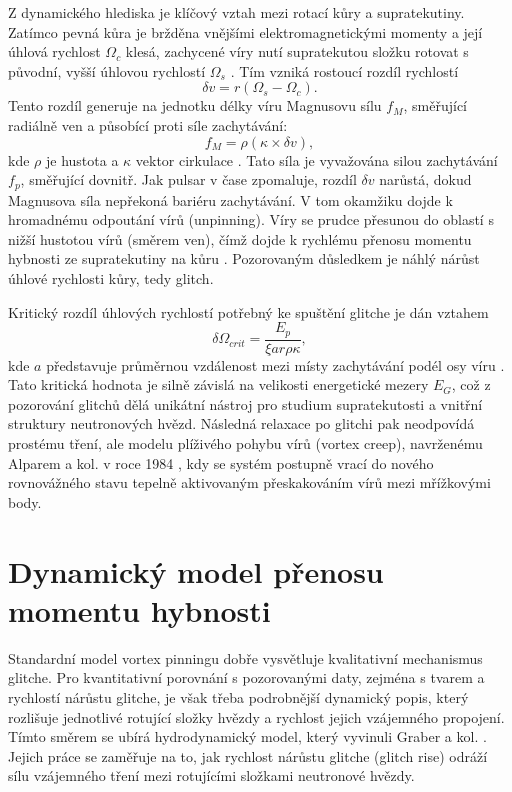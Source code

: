 \documentclass[%
final%
,htext%
]{ipothes}
\begin{document}
Z dynamického hlediska je klíčový vztah mezi rotací kůry a supratekutiny. Zatímco pevná kůra je bržděna vnějšími elektromagnetickými momenty a její úhlová rychlost $\Omega_c$ klesá, zachycené víry nutí supratekutou složku rotovat s původní, vyšší úhlovou rychlostí $\Omega_s$ \cite{ghosh2007}. Tím vzniká rostoucí rozdíl rychlostí
\begin{equation}
\delta v = r(\Omega_s - \Omega_c).
\end{equation}
Tento rozdíl generuje na jednotku délky víru Magnusovu sílu $f_M$, směřující radiálně ven a působící proti síle zachytávání:
\begin{equation}
f_M = \rho(\kappa \times \delta v),
\end{equation}
kde $\rho$ je hustota a $\kappa$ vektor cirkulace \cite{ghosh2007}. Tato síla je vyvažována silou zachytávání $f_p$, směřující dovnitř. Jak pulsar v čase zpomaluje, rozdíl $\delta v$ narůstá, dokud Magnusova síla nepřekoná bariéru zachytávání. V tom okamžiku dojde k hromadnému odpoutání vírů (unpinning). Víry se prudce přesunou do oblastí s nižší hustotou vírů (směrem ven), čímž dojde k rychlému přenosu momentu hybnosti ze supratekutiny na kůru \cite{anderson1975}. Pozorovaným důsledkem je náhlý nárůst úhlové rychlosti kůry, tedy glitch.

Kritický rozdíl úhlových rychlostí potřebný ke spuštění glitche je dán vztahem
\begin{equation}
\delta\Omega_{crit} = \frac{E_p}{\xi a r \rho \kappa},
\end{equation}
kde $a$ představuje průměrnou vzdálenost mezi místy zachytávání podél osy víru \cite{ghosh2007}. Tato kritická hodnota je silně závislá na velikosti energetické mezery $E_G$, což z pozorování glitchů dělá unikátní nástroj pro studium supratekutosti a vnitřní struktury neutronových hvězd. Následná relaxace po glitchi pak neodpovídá prostému tření, ale modelu plíživého pohybu vírů (vortex creep), navrženému Alparem a kol. v roce 1984 \cite{alpar1984}, kdy se systém postupně vrací do nového rovnovážného stavu tepelně aktivovaným přeskakováním vírů mezi mřížkovými body.



\clearpage
\section{Dynamický model přenosu momentu hybnosti}
 
Standardní model vortex pinningu dobře vysvětluje kvalitativní mechanismus glitche. Pro kvantitativní porovnání s pozorovanými daty, zejména s tvarem a rychlostí nárůstu glitche, je však třeba podrobnější dynamický popis, který rozlišuje jednotlivé rotující složky hvězdy a rychlost jejich vzájemného propojení. Tímto směrem se ubírá hydrodynamický model, který vyvinuli Graber a kol. \cite{graber2018}. Jejich práce se zaměřuje na to, jak rychlost nárůstu glitche (glitch rise) odráží sílu vzájemného tření mezi rotujícími složkami neutronové hvězdy.
\end{document}
